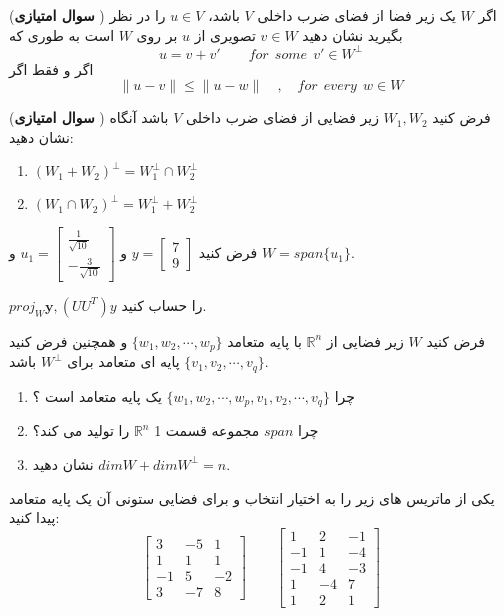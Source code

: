 \documentclass{article}
\begin{document}
({\bf سوال امتیازی })
اگر 
$W$
یک زیر فضا از فضای ضرب داخلی 
$V$
باشد،
$u\in V$
را در نظر بگیرید نشان دهید
$v\in W$
تصویری از 
$u$
بر روی 
$W$
است به طوری که   
 $$u=v+v'\qquad for\  \ some\ \ v' \in W^{\perp}$$
 اگر و فقط اگر 
 $$\parallel u-v\parallel \leq \parallel u-w\parallel\quad,\quad for \ \ every \ \ w\in W $$

 
({\bf سوال امتیازی }) فرض کنید 
$W_1,W_2$
زیر فضایی از فضای ضرب داخلی 
$V$
باشد آنگاه نشان دهید:
\begin{enumerate}
	\item $(W_1+W_2)^{\perp}=W_1^{\perp}\cap W_2^{\perp}$
	\item $(W_1\cap W_2)^{\perp}=W_1^{\perp}+W_2^{\perp}$
\end{enumerate}



  فرض کنید 
 $y=\begin{bmatrix}
 7\\
 9
 \end{bmatrix}$
 و 
 $u_1=\begin{bmatrix}
 \frac{1}{\sqrt{10}}\\
 -\frac{3}{\sqrt{10}}
 \end{bmatrix}$
 و 
 $W=span\{u_1\}$.
 
 
 $proj_W \boldsymbol{y},(UU^T)y$
  را حساب کنید.
 
  فرض کنید 
 $W$
 زیر فضایی از 
 $\mathbb{R}^n$
با پایه متعامد 
$\{w_1,w_2,\cdots,w_p\}$
و همچنین فرض کنید 
$\{v_1,v_2,\cdots,v_q\}$
پایه ای متعامد برای 
$W^{\perp}$
باشد.
\begin{enumerate}
\item 
چرا 
$\{w_1,w_2,\cdots,w_p,v_1,v_2,\cdots,v_q\}$
یک پایه متعامد است ؟
\item 
چرا 
$span$
مجموعه قسمت 1
$\mathbb{R}^n$
را تولید می کند؟
\item 
نشان دهید
$dim W+dim W^{\perp}=n$.

	
\end{enumerate}
 یکی از ماتریس های زیر را به اختیار انتخاب و برای فضایی ستونی آن یک پایه متعامد پیدا کنید:
 $$\begin{bmatrix}
 	3&-5&1\\
 	1&1&1\\
 	-1&5&-2\\
 	3&-7&8
 \end{bmatrix} \qquad
 \begin{bmatrix}
 	1&2&-1\\
 	-1&1&-4\\
 	-1&4&-3\\
 	1&-4&7\\
 	1&2&1
 \end{bmatrix}
 $$
 
\end{document}
